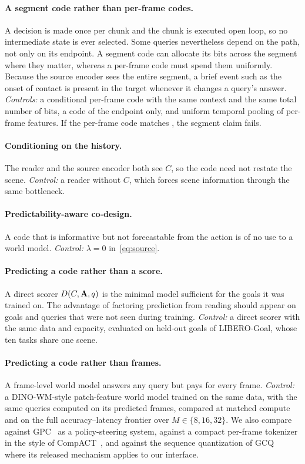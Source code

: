 \paragraph{A segment code rather than per-frame codes.}
A decision is made once per chunk and the chunk is executed open loop, so no intermediate state is ever selected.
Some queries nevertheless depend on the path, not only on its endpoint.
A segment code can allocate its bits across the segment where they matter, whereas a per-frame code must spend them uniformly.
Because the source encoder sees the entire segment, a brief event such as the onset of contact is present in the target whenever it changes a query's answer.
\emph{Controls:} a conditional per-frame code with the same context and the same total number of bits, a code of the endpoint only, and uniform temporal pooling of per-frame features.
If the per-frame code matches \method, the segment claim fails.

\paragraph{Conditioning on the history.}
The reader and the source encoder both see $C$, so the code need not restate the scene.
\emph{Control:} a reader without $C$, which forces scene information through the same bottleneck.

\paragraph{Predictability-aware co-design.}
A code that is informative but not forecastable from the action is of no use to a world model.
\emph{Control:} $\lambda{=}0$ in~\eqref{eq:source}.

\paragraph{Predicting a code rather than a score.}
A direct scorer $D(C,\mathbf{A},q)$ is the minimal model sufficient for the goals it was trained on.
The advantage of factoring prediction from reading should appear on goals and queries that were not seen during training.
\emph{Control:} a direct scorer with the same data and capacity, evaluated on held-out goals of LIBERO-Goal, whose ten tasks share one scene.

\paragraph{Predicting a code rather than frames.}
A frame-level world model answers any query but pays for every frame.
\emph{Control:} a DINO-WM-style patch-feature world model trained on the same data, with the same queries computed on its predicted frames, compared at matched compute and on the full accuracy--latency frontier over $M\in\{8,16,32\}$.
We also compare against GPC~\cite{qi2025gpc} as a policy-steering system, against a compact per-frame tokenizer in the style of CompACT~\cite{kim2026compact}, and against the sequence quantization of GCQ~\cite{peng2025gcq} where its released mechanism applies to our interface.
